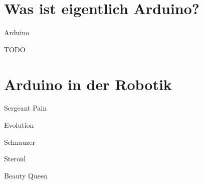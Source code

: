 \documentclass{beamer}
\begin{document}
\section{Was ist eigentlich Arduino?}
\begin{frame}{Arduino}
\begin{large}TODO\end{large}
\end{frame}
\section{Arduino in der Robotik}
\begin{frame}{Sergeant Pain}

\end{frame}
\begin{frame}{Evolution}
	
\end{frame}
\begin{frame}{Schnauzer}
	
\end{frame}
\begin{frame}{Steroid}
	
\end{frame}
\begin{frame}{Beauty Queen}
	
\end{frame}
\end{document}
